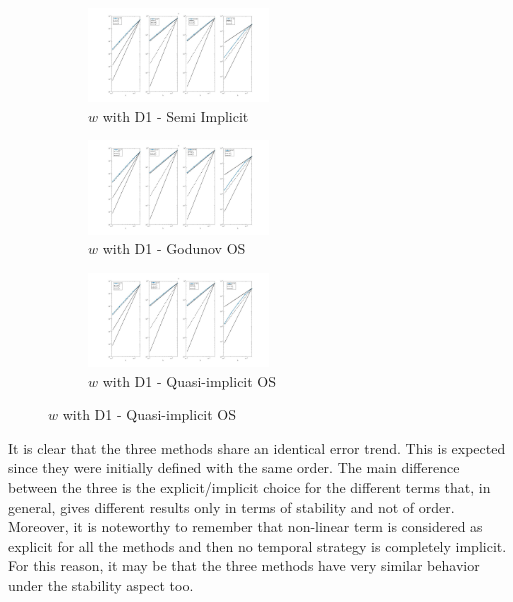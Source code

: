 \documentclass[a4paper,11pt]{article}
\begin{document}
\begin{figure}
\begin{subfigure}{0.3\textwidth}
\includegraphics[width = 4.8cm]{./D1_w_1.jpg}
\caption*{$w$ with D1 - Semi Implicit}
\label{w_D1_SI}
\end{subfigure}
\begin{subfigure}{0.3\textwidth}
\includegraphics[width =4.8cm]{./D1_w_1_GO.jpg}
\caption*{$w$ with D1 - Godunov OS}
\label{w_D1_GO}
\end{subfigure}
\begin{subfigure}{0.3\textwidth}
\includegraphics[width =4.8cm]{./D1_w_1_OS.jpg}
\caption*{$w$ with D1 - Quasi-implicit OS}
\label{w_D1_OS}
\end{subfigure}
\end{figure}
\newpage
\noindent It is clear that the three methods share an identical error trend. This is expected since they were initially defined with the same order. The main difference between the three is the explicit/implicit choice for the different terms that, in general, gives different results only in terms of stability and not of order. Moreover, it is noteworthy to remember that non-linear term is considered as explicit for all the methods and then no temporal strategy is completely implicit. For this reason, it may be that the three methods have very similar behavior under the stability aspect too.

\vspace{5mm}
\end{document}
